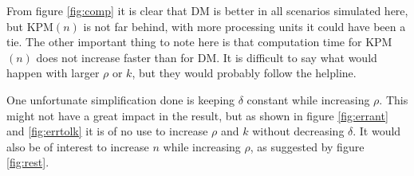 From figure \ref{fig:comp} it is clear that DM is better in all scenarios simulated here, but KPM$(n)$ is not far behind, with more processing units it could have been a tie. The other important thing to note here is that computation time for KPM$(n)$ does not increase faster than for DM. It is difficult to say what would happen with larger $\rho$ or $k$, but they would probably follow the helpline.

One unfortunate simplification done is keeping $\delta$ constant while increasing $\rho$. This might not have a great impact in the result, but as shown in figure \ref{fig:errant} and \ref{fig:errtolk} it is of no use to increase $\rho$ and $k$ without decreasing $\delta$. It would also be of interest to increase $n$ while increasing $\rho$, as suggested by figure \ref{fig:rest}.